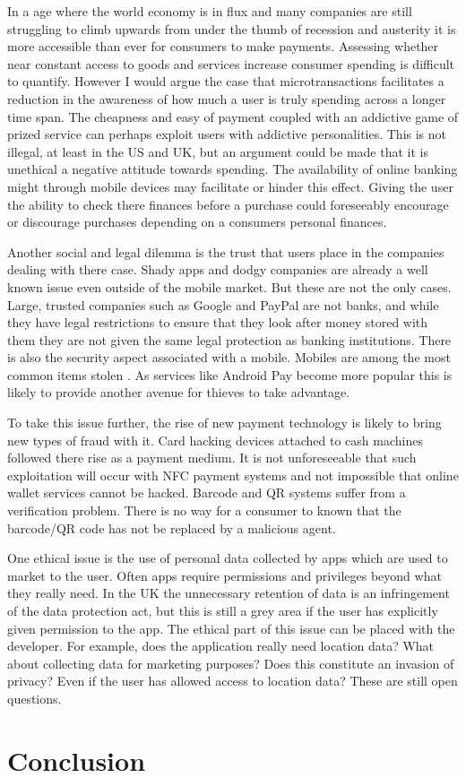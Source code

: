 \documentclass[paper=a4, fontsize=12pt]{scrartcl}	%
\numberwithin{equation}{section}															%
\numberwithin{figure}{section}																%
\numberwithin{table}{section}
\begin{document}
In a age where the world economy is in flux and many companies are still struggling to climb upwards from under the thumb of recession and austerity it is more accessible than ever for consumers to make payments. Assessing whether near constant access to goods and services increase consumer spending is difficult to quantify. However I would argue the case that microtransactions facilitates a reduction in the awareness of how much a user is truly spending across a longer time span. The cheapness and easy of payment coupled with an addictive game of prized service can perhaps exploit users with addictive personalities. This is not illegal, at least in the US and UK, but an argument could be made that it is unethical a negative attitude towards spending. The availability of online banking might through mobile devices may facilitate or hinder this effect. Giving the user the ability to check there finances before a purchase could foreseeably encourage or discourage purchases depending on a consumers personal finances. 

Another social and legal dilemma is the trust that users place in the companies dealing with there case. Shady apps and dodgy companies are already a well known issue even outside of the mobile market. But these are not the only cases. Large, trusted companies such as Google and PayPal are not banks, and while they have legal restrictions \cite{} to ensure that they look after money stored with them they are not given the same legal protection as banking institutions. There is also the security aspect associated with a mobile. Mobiles are among the most common items stolen \cite{}. As services like Android Pay become more popular this is likely to provide another avenue for thieves to take advantage.

To take this issue further, the rise of new payment technology is likely to bring new types of fraud with it. Card hacking devices attached to cash machines followed there rise as a payment medium. It is not unforeseeable that such exploitation will occur with NFC payment systems and not impossible that online wallet services cannot be hacked. Barcode and QR systems suffer from a verification problem. There is no way for a consumer to known that the barcode/QR code has not be replaced by a malicious agent.

One ethical issue is the use of personal data collected by apps which are used to market to the user. Often apps require permissions and privileges beyond what they really need. In the UK the  unnecessary retention of data is an infringement of the data protection act, but this is still a grey area if the user has explicitly given permission to the app. The ethical part of this issue can be placed with the developer. For example, does the application really need location data? What about collecting data for marketing purposes? Does this constitute an invasion of privacy? Even if the user has allowed access to location data? These are still open questions.

\section{Conclusion}

\clearpage


\end{document}
